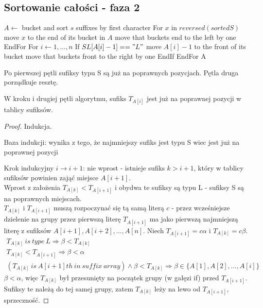 \subsection{Sortowanie całości - faza 2}


\begin{algorithmic}
\State $A \gets$ bucket and sort $s$ suffixes by first character
\State For $x$ in $reversed(sortedS)$ 
\State move $x$ to the end of its bucket in $A$
\State move that buckets end to the left by one
\State EndFor
\State For $i \gets 1,...,n$ 
\State If $SL[A[i]-1] == "L"$
\State move $A[i]-1$ to the front of its bucket
\State move that buckets front to the right by one
\State EndIf
\State EndFor
\State \Return A
\EndProcedure
\end{algorithmic}


Po pierwszej pętli sufiksy typu S są już na poprawnych pozycjach. Pętla druga porządkuje resztę.

\begin{lemma}{}{}\label{phase2-invariant}
W kroku i drugiej pętli algorytmu, sufiks $T_{A[i]}$ jest już na poprawnej pozycji w tablicy sufiksów.
\end{lemma}
\begin{proof}
Indukcja.
\item[Baza indukcji:] wynika z tego, że najmniejszy sufiks jest typu S wiec jest już na poprawnej pozycji
\item[Krok indukcyjny $i \rightarrow i+1$:] nie wprost - istnieje sufiks $k > i+1$, który w tablicy sufiksów powinien zająć miejsce $A[i+1]$.\\
Wprost z założenia $T_{A[k]} < T_{A[i+1]}$ i obydwa te sufiksy są typu L - sufiksy S są na poprawnych miejscach.\\
$T_{A[k]}$ i $T_{A[i+1]}$ muszą rozpoczynać się tą samą literą $c$ - przez wcześniejsze dzielenie na grupy przez pierwszą literę $T_{A[i+1]}$ ma jako pierwszą najmniejszą literę z sufiksów $A[i+1],A[i+2],...,A[n]$. Niech $T_{A[i+1]}=c \alpha$ i $T_{A[k]}=c \beta$.\\
\begin{gather*}
T_{A[k]}\ is\ type\ L \Rightarrow \beta < T_{A[k]}\\
T_{A[k]} < T_{A[i+1]} \Rightarrow \beta < \alpha\\
(T_{A[k]}\ is\ A[i+1]th\ in\ suffix\ array) \land \beta < T_{A[k]} \Rightarrow \beta \in \{A[1],A[2],...,A[i]\}
\end{gather*}
$\beta < \alpha$, więc $T_{A[k]}$ był przesunięty na początek grupy (w gałęzi if) przed $T_{A[i+1]}$. Sufiksy te należą do tej samej grupy, zatem $T_{A[k]}$ leży na lewo od $T_{A[i+1]}$, sprzeczność.
\end{proof}

